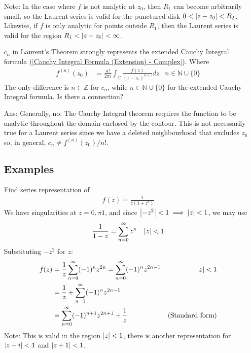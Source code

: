 \documentclass[12pt, english]{book}
\begin{document}
	Note: In the case where \(f\) is not analytic at \(z_0\), then \(R_1\) can become arbitrarily small, so the Laurent series is valid for the punctured disk \(0 < \abs{z-z_0}<R_2\). Likewise, if \(f\) is only analytic for points outside \(R_1\), then the Laurent series is valid for the region \(R_1 < \abs{z-z_0} < \infty\).
	
	\begin{question}
		\(c_n\) in Laurent's Theorem strongly represents the extended Cauchy Integral formula (\cref{Cauchy Integral Formula (Extension) - Complex}). Where 
		\begin{align*}
			f^{(n)}(z_0) &= \frac{n!}{2\pi i} \int_{C} \frac{f(z)}{(z-z_0)^{n+1}} dz & n \in \mathbb{N} \cup \{0\}
		\end{align*}
		The only difference is \(n \in \mathbb{Z}\) for \(c_n\), while \(n \in \mathbb{N}\cup \{0\}\) for the extended Cauchy Integral formula. Is there a connection?
		
		Ans: Generally, no. The Cauchy Integral theorem requires the function to be analytic throughout the domain enclosed by the contour. This is not necessarily true for a Laurent series since we have a deleted neighbourhood that excludes \(z_0\) so, in general, \(c_n \neq f^{(n)}(z_0)/n!\).
	\end{question}
	
	\subsection{Examples}
	
	\begin{example}
		Find series representation of
		\begin{align*}
			f(z) = \frac{1}{z(1+z^2)}
		\end{align*}
		We have singularities at \(z = 0, \pi 1\), and since \(\abs{-z^2}<1 \implies \abs{z}<1\), we may use 
		\begin{align*}
			\frac{1}{1-z} &= \sum_{n=0}^\infty z^n & \abs{z}<1
		\end{align*}
		Substituting \(-z^2\) for \(z\):
		\begin{align*}
			f(z) 
			&= \frac{1}{z} \sum_{n=0}^{\infty} (-1)^n z^{2n} = \sum_{n=0}^{\infty} (-1)^n z^{2n-1} & \abs{z}<1 \\
			&= \frac{1}{z} + \sum_{n=1}^{\infty} (-1)^n z^{2n-1} \\
			&= \sum_{n=0}^{\infty} (-1)^{n+1} z^{2n+1} + \frac{1}{z} &\text{(Standard form)}
		\end{align*}
		Note: This is valid in the region \(\abs{z}<1\), there is another representation for \(\abs{z-i}<1\) and \(\abs{z+1}<1\).
	\end{example}
	
\end{document}
